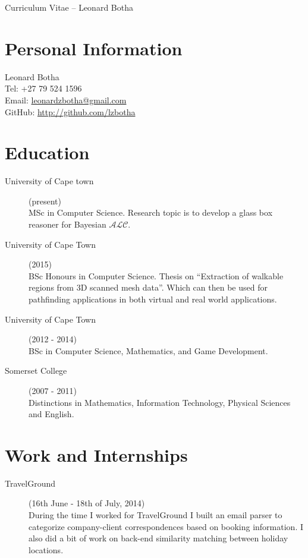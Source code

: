 \documentclass[margin,line,a4paper]{resume}
\begin{document}
    {\sc \Large Curriculum Vitae -- Leonard Botha}
    \begin{resume}
        \vspace{0.5cm}

        \section{\mysidestyle Personal Information}
            Leonard Botha\\
            Tel: +27 79 524 1596\\
            Email: \href{mailto:leonardzbotha@gmail.com}{leonardzbotha@gmail.com}\\
            GitHub: \href{http://github.com/lzbotha}{http://github.com/lzbotha}\\

        \section{\mysidestyle Education}
            \begin{description}
                \item[University of Cape town] (present)\\
                    MSc in Computer Science. Research topic is to develop a glass box reasoner for Bayesian $\mathcal{ALC}$.

                \item[University of Cape Town] (2015) \\
                    BSc Honours in Computer Science. Thesis on ``Extraction of  walkable regions from 3D scanned mesh data''.
                    Which can then be used for pathfinding applications in both virtual and real world applications.

                \item[University of Cape Town] (2012 - 2014) \\
                    BSc in Computer Science, Mathematics, and Game Development.

                \item[Somerset College](2007 - 2011)\\
                    Distinctions in Mathematics, Information Technology, Physical
Sciences and English.
            \end{description}


        \section{\mysidestyle Work and Internships}
            \begin{description}
                \item[TravelGround] (16th June - 18th of July, 2014) \\
                    During the time I worked for TravelGround I built an email parser to categorize company-client correspondences based on booking information. I also did a bit of work on back-end similarity matching between holiday locations.


\end{description}
\end{resume}
\end{document}
